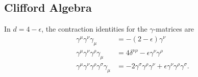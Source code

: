 \begin{appendices}
\section{Clifford Algebra}%
\label{sec:clifford_algebra}

In $d = 4 - \epsilon$, the contraction identities for the $\gamma$-matrices are \cite[Eq.~(7.89)]{peskin}
\begin{align}
  \gamma^{\mu} \gamma^{\nu} \gamma_{\mu} &= - (2 - \epsilon) \gamma^{\nu}  \\
  \gamma^{\mu} \gamma^{\nu} \gamma^{\rho} \gamma_{\mu} &= 4 \delta^{\nu\rho} - \epsilon \gamma^{\nu} \gamma^{\rho} \\
  \gamma^{\mu} \gamma^{\nu} \gamma^{\rho} \gamma^{\sigma} \gamma_{\mu} &= -2 \gamma^{\sigma} \gamma^{\rho} \gamma^{\nu} + \epsilon \gamma^{\nu} \gamma^{\rho} \gamma ^{\sigma}.
\end{align}

\end{appendices}
